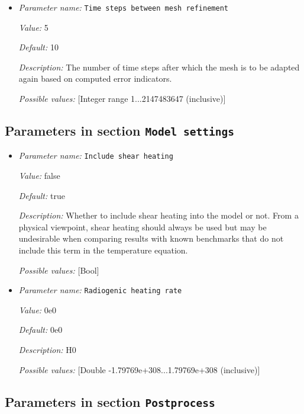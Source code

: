 \begin{itemize}
{\it Description:} The fraction of cells with the largest error that should be flagged for refinement.


{\it Possible values:} [Double 0...1 (inclusive)]
\item {\it Parameter name:} {\tt Time steps between mesh refinement}


{\it Value:} 5


{\it Default:} 10


{\it Description:} The number of time steps after which the mesh is to be adapted again based on computed error indicators.


{\it Possible values:} [Integer range 1...2147483647 (inclusive)]
\end{itemize}

\subsection{Parameters in section \tt Model settings}

\begin{itemize}
\item {\it Parameter name:} {\tt Include shear heating}


{\it Value:} false


{\it Default:} true


{\it Description:} Whether to include shear heating into the model or not. From a physical viewpoint, shear heating should always be used but may be undesirable when comparing results with known benchmarks that do not include this term in the temperature equation.


{\it Possible values:} [Bool]
\item {\it Parameter name:} {\tt Radiogenic heating rate}


{\it Value:} 0e0


{\it Default:} 0e0


{\it Description:} H0


{\it Possible values:} [Double -1.79769e+308...1.79769e+308 (inclusive)]
\end{itemize}

\subsection{Parameters in section \tt Postprocess}

